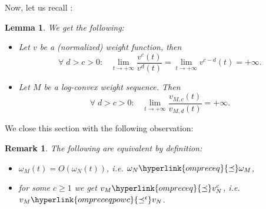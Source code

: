 \documentclass[10pt]{amsart}%
\numberwithin{equation}{section}
\theoremstyle{plain}
\newtheorem{lemma}[proposition]{Lemma}
\newtheorem{remark}[proposition]{Remark}
\begin{document}
Now, let us recall \cite[Rem. 2.3, Lemma 2.9]{weightedentirecharacterization}:

\begin{lemma}\label{strongdilaremark}
We get the following:
\begin{itemize}
\item[$(i)$] Let $v$ be a (normalized) weight function, then
\begin{equation}\label{strongweightsrelation1}
\forall\;d>c>0:\;\;\;\lim_{t\rightarrow+\infty}\frac{v^c(t)}{v^d(t)}=\lim_{t\rightarrow+\infty}v^{c-d}(t)=+\infty.
\end{equation}

\item[$(ii)$] Let $M$ be a log-convex weight sequence. Then
\begin{equation}\label{strongweightsrelation}
\forall\;d>c>0:\;\;\;\lim_{t\rightarrow+\infty}\frac{v_{M,c}(t)}{v_{M,d}(t)}=+\infty.
\end{equation}
\end{itemize}
\end{lemma}

We close this section with the following observation:

\begin{remark}\label{BigOequivrem}
\emph{The following are equivalent by definition:}
\begin{itemize}
\item[$(*)$] \emph{$\omega_M(t)=O(\omega_N(t))$, i.e. $\omega_N\hyperlink{ompreceq}{\preceq}\omega_M$,}

\item[$(*)$] \emph{for some $c\ge 1$ we get $v_M\hyperlink{ompreceq}{\preceq}v_N^c$, i.e. $v_M\hyperlink{ompreceqpowc}{\preceq^{\mathfrak{c}}}v_N$.}
\end{itemize}
\end{remark}
\end{document}

